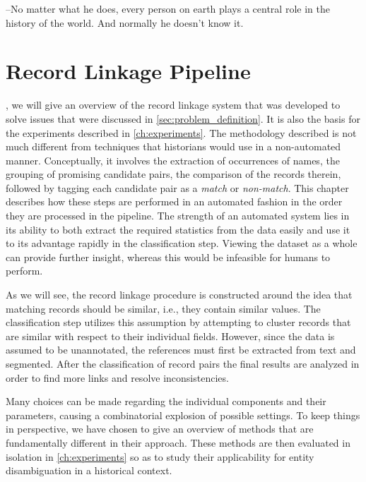 \begin{savequote}[75mm] 
--No matter what he does, every person on earth plays a central role in the history of the world. And normally he doesn't know it.
\end{savequote}




\chapter{Record Linkage Pipeline}
\label{ch:record_linker}

, we will give an overview of the record linkage system that was developed to solve issues that were discussed in \cref{sec:problem_definition}.
It is also the basis for the experiments described in \cref{ch:experiments}.
The methodology described is not much different from techniques that historians would use in a non-automated manner.
Conceptually, it involves the extraction of occurrences of names, the grouping of promising candidate pairs, the comparison of the records therein, followed by tagging each candidate pair as a \emph{match} or \emph{non-match}.
This chapter describes how these steps are performed in an automated fashion in the order they are processed in the pipeline.
The strength of an automated system lies in its ability to both extract the required statistics from the data easily and use it to its advantage rapidly in the classification step.
Viewing the dataset as a whole can provide further insight, whereas this would be infeasible for humans to perform.

As we will see, the record linkage procedure is constructed around the idea that matching records should be similar, i.e., they contain similar values.
The classification step utilizes this assumption by attempting to cluster records that are similar with respect to their individual fields. 
However, since the data is assumed to be unannotated, the references must first be extracted from text and segmented.
After the classification of record pairs the final results are analyzed in order to find more links and resolve inconsistencies.

Many choices can be made regarding the individual components and their parameters, causing a combinatorial explosion of possible settings.
To keep things in perspective, we have chosen to give an overview of methods that are fundamentally different in their approach.
These methods are then evaluated in isolation in \cref{ch:experiments} so as to study their applicability for entity disambiguation in a historical context.


